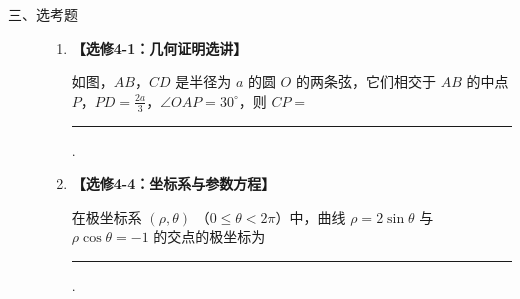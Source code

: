 \begin{description}

    \item[三、选考题]

    \begin{enumerate}[leftmargin=5pt]

      \addtocounter{enumi}{+13}

        \item \textbf{【选修4-1：几何证明选讲】}

如图，\(AB\)，\(CD\) 是半径为 \(a\) 的圆 \(O\) 的两条弦，它们相交于 \(AB\) 的中点 \(P\)，\(PD = \frac{2a}{3}\)，\(\angle OAP = 30^\circ\)，则 \(CP = \)\rule[-0.3ex]{3em}{0.4pt}.

        \item \textbf{【选修4-4：坐标系与参数方程】}

在极坐标系 \((\rho, \theta)\) （\(0 \leqslant \theta < 2\pi\)）中，曲线 \(\rho = 2\sin \theta\) 与 \(\rho \cos \theta = -1\) 的交点的极坐标为\rule[-0.3ex]{3em}{0.4pt}.

    \end{enumerate}

\end{description}

